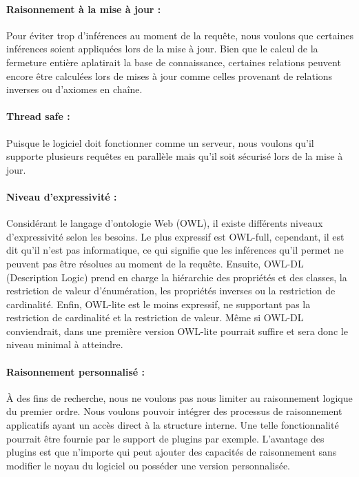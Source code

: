\paragraph{Raisonnement à la mise à jour :} Pour éviter trop d'inférences au moment de la requête, nous voulons que certaines inférences soient appliquées lors de la mise à jour. Bien que le calcul de la fermeture entière aplatirait la base de connaissance, certaines relations peuvent encore être calculées lors de mises à jour comme celles provenant de relations inverses ou d'axiomes en chaîne.

\paragraph{Thread safe :} Puisque le logiciel doit fonctionner comme un serveur, nous voulons qu'il supporte plusieurs requêtes en parallèle mais qu'il soit sécurisé lors de la mise à jour.

\paragraph{Niveau d'expressivité :} Considérant le langage d'ontologie Web (OWL), il existe différents niveaux d'expressivité selon les besoins. Le plus expressif est OWL-full, cependant, il est dit qu'il n'est pas informatique, ce qui signifie que les inférences qu'il permet ne peuvent pas être résolues au moment de la requête. Ensuite, OWL-DL (Description Logic) prend en charge la hiérarchie des propriétés et des classes, la restriction de valeur d'énumération, les propriétés inverses ou la restriction de cardinalité. Enfin, OWL-lite est le moins expressif, ne supportant pas la restriction de cardinalité et la restriction de valeur. Même si OWL-DL conviendrait, dans une première version OWL-lite pourrait suffire et sera donc le niveau minimal à atteindre.

\paragraph{Raisonnement personnalisé :} À des fins de recherche, nous ne voulons pas nous limiter au raisonnement logique du premier ordre. Nous voulons pouvoir intégrer des processus de raisonnement applicatifs ayant un accès direct à la structure interne. Une telle fonctionnalité pourrait être fournie par le support de plugins par exemple. L'avantage des plugins est que n'importe qui peut ajouter des capacités de raisonnement sans modifier le noyau du logiciel ou posséder une version personnalisée.

